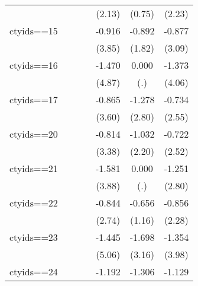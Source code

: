 \begin{table}[htbp]
\begin{center}
\begin{threeparttable}
\begin{tabular}{l*{6}{c}}
                &                  &                  &                  &   (2.13)         &   (0.75)         &   (2.23)         \\
ctyids==15      &                  &                  &                  &   -0.916\sym{***}&   -0.892\sym{*}  &   -0.877\sym{***}\\
                &                  &                  &                  &   (3.85)         &   (1.82)         &   (3.09)         \\
ctyids==16      &                  &                  &                  &   -1.470\sym{***}&    0.000         &   -1.373\sym{***}\\
                &                  &                  &                  &   (4.87)         &      (.)         &   (4.06)         \\
ctyids==17      &                  &                  &                  &   -0.865\sym{***}&   -1.278\sym{***}&   -0.734\sym{**} \\
                &                  &                  &                  &   (3.60)         &   (2.80)         &   (2.55)         \\
ctyids==20      &                  &                  &                  &   -0.814\sym{***}&   -1.032\sym{**} &   -0.722\sym{**} \\
                &                  &                  &                  &   (3.38)         &   (2.20)         &   (2.52)         \\
ctyids==21      &                  &                  &                  &   -1.581\sym{***}&    0.000         &   -1.251\sym{***}\\
                &                  &                  &                  &   (3.88)         &      (.)         &   (2.80)         \\
ctyids==22      &                  &                  &                  &   -0.844\sym{***}&   -0.656         &   -0.856\sym{**} \\
                &                  &                  &                  &   (2.74)         &   (1.16)         &   (2.28)         \\
ctyids==23      &                  &                  &                  &   -1.445\sym{***}&   -1.698\sym{***}&   -1.354\sym{***}\\
                &                  &                  &                  &   (5.06)         &   (3.16)         &   (3.98)         \\
ctyids==24      &                  &                  &                  &   -1.192\sym{***}&   -1.306\sym{***}&   -1.129\sym{***}\\

\end{tabular}
\end{threeparttable}
\end{center}
\end{table}
